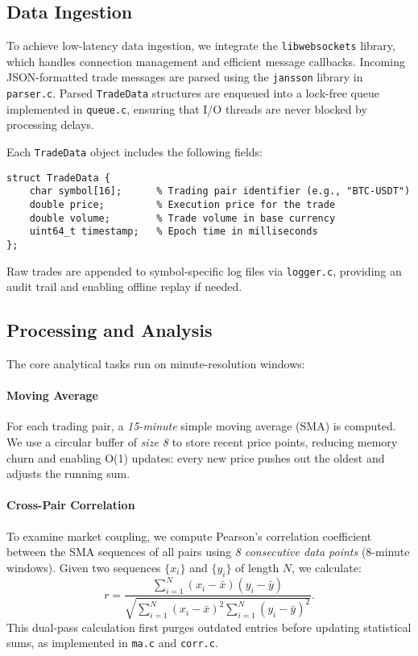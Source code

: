 \documentclass{article}
\begin{document}
\subsection{Data Ingestion}
To achieve low-latency data ingestion, we integrate the \texttt{libwebsockets} library, which handles connection management and efficient message callbacks. Incoming JSON-formatted trade messages are parsed using the \texttt{jansson} library in \texttt{parser.c}. Parsed \texttt{TradeData} structures are enqueued into a lock-free queue implemented in \texttt{queue.c}, ensuring that I/O threads are never blocked by processing delays.

Each \texttt{TradeData} object includes the following fields:
\begin{verbatim}
struct TradeData {
    char symbol[16];      % Trading pair identifier (e.g., "BTC-USDT")
    double price;         % Execution price for the trade
    double volume;        % Trade volume in base currency
    uint64_t timestamp;   % Epoch time in milliseconds
};
\end{verbatim}
Raw trades are appended to symbol-specific log files via \texttt{logger.c}, providing an audit trail and enabling offline replay if needed.

\subsection{Processing and Analysis}
The core analytical tasks run on minute-resolution windows:

\paragraph{Moving Average} For each trading pair, a \textit{15-minute} simple moving average (SMA) is computed. We use a circular buffer of \textit{size 8} to store recent price points, reducing memory churn and enabling O(1) updates: every new price pushes out the oldest and adjusts the running sum.

\paragraph{Cross-Pair Correlation} To examine market coupling, we compute Pearson's correlation coefficient between the SMA sequences of all pairs using \textit{8 consecutive data points} (8-minute windows). Given two sequences $\{x_i\}$ and $\{y_i\}$ of length $N$, we calculate:
\[
r = \frac{\sum_{i=1}^N (x_i - \bar{x})(y_i - \bar{y})}{\sqrt{\sum_{i=1}^N (x_i - \bar{x})^2 \sum_{i=1}^N (y_i - \bar{y})^2}}.
\]
This dual-pass calculation first purges outdated entries before updating statistical sums, as implemented in \texttt{ma.c} and \texttt{corr.c}.
\end{document}
